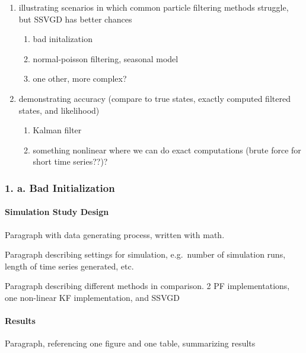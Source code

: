 \documentclass[]{article}
\providecommand{\tightlist}{%
  \setlength{\itemsep}{0pt}\setlength{\parskip}{0pt}}
\let\oldparagraph\paragraph
\renewcommand{\paragraph}[1]{\oldparagraph{#1}\mbox{}}
\begin{document}
\begin{enumerate}
\def\labelenumi{\arabic{enumi}.}
\tightlist
\item
  illustrating scenarios in which common particle filtering methods
  struggle, but SSVGD has better chances

  \begin{enumerate}
  \def\labelenumii{\alph{enumii}.}
  \tightlist
  \item
    bad initalization
  \item
    normal-poisson filtering, seasonal model
  \item
    one other, more complex?
  \end{enumerate}
\item
  demonstrating accuracy (compare to true states, exactly computed
  filtered states, and likelihood)

  \begin{enumerate}
  \def\labelenumii{\alph{enumii}.}
  \tightlist
  \item
    Kalman filter
  \item
    something nonlinear where we can do exact computations (brute force
    for short time series??)?
  \end{enumerate}
\end{enumerate}

\subsubsection{1. a. Bad Initialization}\label{a.-bad-initialization}

\paragraph{Simulation Study Design}\label{simulation-study-design}

Paragraph with data generating process, written with math.

Paragraph describing settings for simulation, e.g.~number of simulation
runs, length of time series generated, etc.

Paragraph describing different methods in comparison. 2 PF
implementations, one non-linear KF implementation, and SSVGD

\paragraph{Results}\label{results}

Paragraph, referencing one figure and one table, summarizing results
\end{document}
